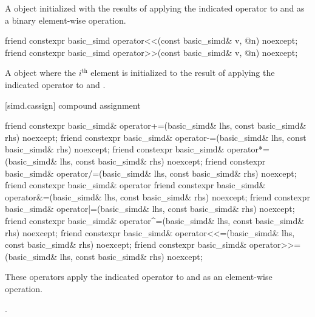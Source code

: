 \begin{itemdescr}
  \pnum\ConstraintOperatorTWellFormed

  \pnum\returns
  A  object initialized with the results of applying the indicated operator to  and  as a binary element-wise operation.
\end{itemdescr}

\begin{itemdecl}
friend constexpr basic_simd operator<<(const basic_simd& v, @\simdsizetype@ n) noexcept;
friend constexpr basic_simd operator>>(const basic_simd& v, @\simdsizetype@ n) noexcept;
\end{itemdecl}

\begin{itemdescr}
  \pnum\ConstraintOperatorTWellFormed

  \pnum\returns
  A  object where the $i^\text{th}$ element is initialized to the result of applying the indicated operator to  and  \foralli.
\end{itemdescr}

[simd.cassign]{ compound assignment}

\begin{itemdecl}
friend constexpr basic_simd& operator+=(basic_simd& lhs, const basic_simd& rhs) noexcept;
friend constexpr basic_simd& operator-=(basic_simd& lhs, const basic_simd& rhs) noexcept;
friend constexpr basic_simd& operator*=(basic_simd& lhs, const basic_simd& rhs) noexcept;
friend constexpr basic_simd& operator/=(basic_simd& lhs, const basic_simd& rhs) noexcept;
friend constexpr basic_simd& operator%
friend constexpr basic_simd& operator&=(basic_simd& lhs, const basic_simd& rhs) noexcept;
friend constexpr basic_simd& operator|=(basic_simd& lhs, const basic_simd& rhs) noexcept;
friend constexpr basic_simd& operator^=(basic_simd& lhs, const basic_simd& rhs) noexcept;
friend constexpr basic_simd& operator<<=(basic_simd& lhs, const basic_simd& rhs) noexcept;
friend constexpr basic_simd& operator>>=(basic_simd& lhs, const basic_simd& rhs) noexcept;
\end{itemdecl}

\begin{itemdescr}
  \pnum\ConstraintOperatorTWellFormed

  \pnum\effects
  These operators apply the indicated operator to  and  as an element-wise operation.

  \pnum\returns
  .
\end{itemdescr}

